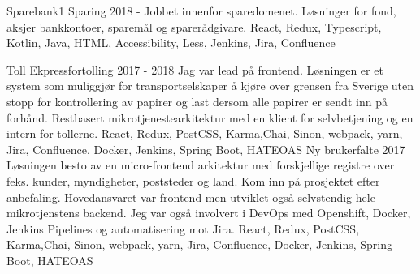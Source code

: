 

\begin{cventries}
    \kunde
    {Sparebank1} %
    \project
    {Sparing}
    {2018 - }
    {Jobbet innenfor sparedomenet. Løsninger for fond, aksjer bankkontoer, sparemål og sparerådgivare.}
    {React, Redux, Typescript, Kotlin, Java, HTML, Accessibility, Less, Jenkins, Jira, Confluence}

    \kunde
    {Toll} %
    \project
    {Ekpressfortolling}
    {2017 - 2018}
    {Jag var lead på frontend.
    Løsningen er et system som muliggjør for transportselskaper å kjøre over grensen fra Sverige uten stopp for kontrollering av
    papirer og last dersom alle papirer er sendt inn på forhånd. Restbasert mikrotjenestearkitektur med en klient for selvbetjening og en intern for tollerne. }
    {React, Redux, PostCSS, Karma,Chai, Sinon, webpack, yarn, Jira, Confluence, Docker, Jenkins, Spring Boot, HATEOAS}
    \project
    {Ny brukerfalte}
    {2017}
    {Løsningen besto av en micro-frontend arkitektur med forskjellige registre over feks.
    kunder, myndigheter, poststeder og land. Kom inn på prosjektet efter anbefaling.
    Hovedansvaret var frontend men utviklet også selvstendig hele mikrotjenstens backend.
    Jeg var også involvert i DevOps med Openshift, Docker, Jenkins Pipelines og automatisering mot Jira.}
    {React, Redux, PostCSS, Karma,Chai, Sinon, webpack, yarn, Jira, Confluence, Docker, Jenkins, Spring Boot, HATEOAS}



\end{cventries}
